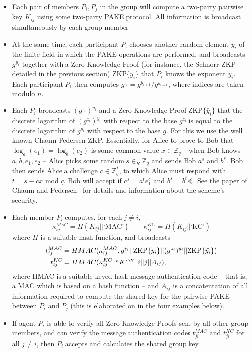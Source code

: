 \begin{itemize} \itemsep=1.2em
\item Each pair of members $P_i,P_j$ in the group will compute a two-party pairwise key $K_{ij}$ using some two-party PAKE protocol.  All information is broadcast simultaneously by each group member
\item At the same time, each participant $P_i$ chooses another random element $y_i$ of the finite field in which the PAKE operations are performed, and broadcasts $g^{y_i}$ together with a Zero Knowledge Proof (for instance, the Schnorr ZKP detailed in the previous section) ZKP$\{y_i\}$ that $P_i$ knows the exponent $y_i$.  Each participant $P_i$ then computes $g^{z_i} = g^{y_{i+1}}/g^{y_{i-1}}$, where indices are taken modulo $n$.
\item  Each $P_i$ broadcasts $(g^{z_i})^{y_i}$ and a Zero Knowledge Proof ZKP$\{\tilde{y_i}\}$ that the discrete logarithm of $(g^{z_i})^{y_i}$ with respect to the base $g^{z_i}$ is equal to the discrete logarithm of $g^{y_i}$ with respect to the base $g$. For this we use the well known Chaum-Pedersen ZKP. Essentially, for Alice to prove to Bob that $\log_a(e_1) = \log_b(e_2)$ is some common value $x \in \mathbb{Z}_q$ -- when Bob knows $a,b,e_1,e_2$ -- Alice picks some random $s \in_R \mathbb{Z}_q$ and sends Bob $a^s$ and $b^s$.  Bob then sends Alice a challenge $c \in \mathbb{Z}_q^*$, to which Alice must respond with $t = s-cx$ mod $q$.  Bob will accept if $a^s = a^t e_1^{c}$ and $b^s = b^t e_2^{c}$.  See the paper of Chaum and Pedersen~\cite{ChPe92} for details and information about the scheme's security.
\item Each member $P_i$ computes, for each $j \neq i$,
\[ \kappa_{ij}^{MAC} = H(K_{ij} || \text{`MAC'}) \qquad \kappa_{ij}^{KC} = H(K_{ij} || \text{`KC'}) \] 
where $H$ is a suitable hash function, and broadcasts
\begin{align*}
t_{ij}^{MAC} &= HMAC(\kappa_{ij}^{MAC},  g^{y_i} || \text{ZKP}\{y_i\} || (g^{z_i})^{y_i} || \text{ZKP}\{\tilde{y_i}\})\\
        t_{ij}^{KC} &= HMAC(\kappa_{ij}^{KC}, ``KC''|| i || j || A_{ij}),
\end{align*}
where HMAC is a suitable keyed-hash message authentication code -- that is, a MAC which is based on a hash function -- and $A_{ij}$ is a concatentation of all information required to compute the shared key for the pairwise PAKE between $P_i$ and $P_j$ (this is elaborated on in the four examples below).
\item If agent $P_i$ is able to verify all Zero Knowledge Proofs sent by all other group members, and can verify the message authentication codes $t_{ji}^{MAC}$ and $t_{ji}^{KC}$ for all $j \neq i$, then $P_i$ accepts and calculates the shared group key

\end{itemize}

